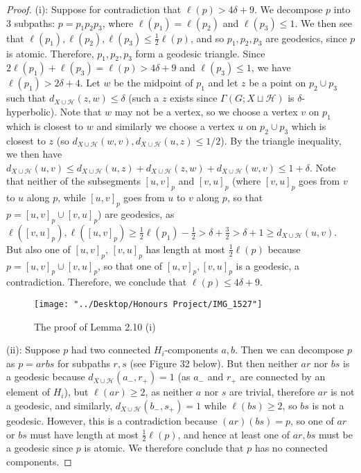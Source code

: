 \documentclass[12pt]{article}
\newcommand{\vs}{\vskip10pt}
\begin{document}
	\begin{proof}
		
		(i): Suppose for contradiction that $\ell(p) > 4 \delta + 9$. We decompose $p$ into 3 subpaths: $p = p_1 p_2 p_3$, where $\ell(p_1) = \ell(p_2)$ and $\ell(p_3) \leq 1$. We then see that $\ell(p_1),\ell(p_2), \ell(p_3) \leq \frac{1}{2}\ell(p)$, and so $p_1, p_2, p_3$ are geodesics, since $p$ is atomic. Therefore, $p_1,p_2,p_3$ form a geodesic triangle. Since $2 \ell(p_1) + \ell(p_3) = \ell(p) > 4 \delta + 9$ and $\ell(p_3) \leq 1$, we have $\ell(p_1) > 2 \delta + 4$. Let $w$ be the midpoint of $p_1$ and let $z$ be a point on $p_2 \cup p_3$ such that $d_{X \cup \mathcal{H}}(z, w) \leq \delta$ (such a $z$ exists since $\Gamma(G; X \sqcup \mathcal{H})$ is $\delta$-hyperbolic). Note that $w$ may not be a vertex, so we choose a vertex $v$ on $p_1$ which is closest to $w$ and similarly we choose a vertex $u$ on $p_2 \cup p_3$ which is closest to $z$ (so $d_{X \cup \mathcal{H}}(w, v), d_{X \cup \mathcal{H}}(u,z) \leq 1/2$). By the triangle inequality, we then have $d_{X \cup \mathcal{H}}(u,v) \leq d_{X \cup \mathcal{H}}(u,z) + d_{X \cup \mathcal{H}}(z, w) + d_{X \cup \mathcal{H}}(w, v) \leq 1 + \delta$. Note that neither of the subsegments $[u,v]_p$ and $[v,u]_p$ (where $[v,u]_p$ goes from $v$ to $u$ along $p$, while $[u,v]_p$ goes from $u$ to $v$ along $p$, so that $p = [u,v]_p \cup [v,u]_p$) are geodesics, as $\ell([v,u]_p), \ell([u,v]_p) \geq \frac{1}{2} \ell(p_1) - \frac{1}{2} > \delta + \frac{3}{2} > \delta + 1 \geq d_{X \cup \mathcal{H}}(u,v)$. But also one of $[u,v]_p$, $[v,u]_p$ has length at most $\frac{1}{2} \ell(p)$ because $p = [u,v]_p \cup [v,u]_p$, so that one of $[u,v]_p, [v,u]_p$ is a geodesic, a contradiction. Therefore, we conclude that $\ell(p) \leq 4 \delta + 9$. 
		
\begin{figure} [H]
	\centering
	\texttt{[image: "../Desktop/Honours Project/IMG\_1527"]}
	\caption{The proof of Lemma 2.10 (i)}
	\label{fig:img1527}
\end{figure}
		
		\vs 
		
		(ii): Suppose $p$ had two connected $H_i$-components $a,b$. Then we can decompose $p$ as $p = a r b s$ for subpaths $r,s$ (see Figure 32 below). But then neither $ar$ nor $bs$ is a geodesic because $d_{X \cup \mathcal{H}}(a_-, r_+) = 1$ (as $a_-$ and $r_+$ are connected by an element of $H_i$), but $\ell(ar) \geq 2$, as neither $a$ nor $s$ are trivial, therefore $ar$ is not a geodesic, and similarly, $d_{X \cup \mathcal{H}}(b_-, s_+) = 1$ while $\ell(bs) \geq 2$, so $bs$ is not a geodesic. However, this is a contradiction because $(ar)(bs) = p$, so one of $ar$ or $bs$ must have length at most $\frac{1}{2} \ell(p)$, and hence at least one of $ar, bs$ must be a geodesic since $p$ is atomic. We therefore conclude that $p$ has no connected components.
		

\end{proof}
\end{document}
